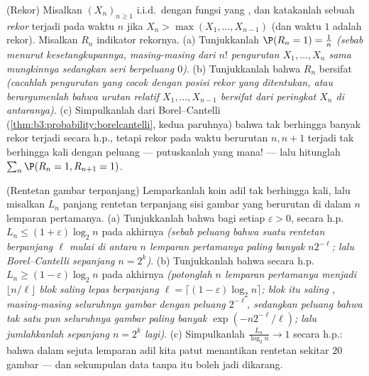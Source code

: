\begin{exercise}[$\star\star$]\label{exo:b3:probability:11}
(Rekor) Misalkan $(X_n)_{n\geq1}$ i.i.d.\ dengan fungsi
 yang , dan katakanlah sebuah \emph{rekor} terjadi pada
waktu $n$ jika $X_n > \max(X_1, \dots, X_{n-1})$ (dan waktu $1$
adalah rekor). Misalkan $R_n$ indikator rekornya.
(a) Tunjukkanlah $\P(R_n = 1) = \frac1n$ \emph{(sebab menurut kesetangkupannya, masing-masing dari
$n!$ pengurutan $X_1, \dots, X_n$ sama mungkinnya
sedangkan seri berpeluang $0$)}.
(b) Tunjukkanlah bahwa $R_n$ bersifat \emph{} \emph{(cacahlah
pengurutan yang cocok dengan posisi rekor yang ditentukan, atau
berargumenlah bahwa urutan relatif $X_1, \dots, X_{n-1}$ bersifat
 dari peringkat $X_n$ di antaranya)}.
(c) Simpulkanlah dari Borel--Cantelli
(\cref{thm:b3:probability:borelcantelli}, kedua paruhnya) bahwa
tak berhingga banyak rekor terjadi secara h.p., tetapi rekor pada
waktu berurutan $n, n+1$ terjadi tak berhingga kali dengan
peluang --- putuskanlah yang mana! --- lalu hitunglah
$\sum_n\P(R_n = 1, R_{n+1} = 1)$.
\end{exercise}

\begin{exercise}[$\star\star$]\label{exo:b3:probability:12}
(Rentetan gambar terpanjang) Lemparkanlah koin adil tak berhingga kali, lalu
misalkan $L_n$ panjang rentetan terpanjang sisi gambar yang
berurutan di dalam $n$ lemparan pertamanya.
(a) Tunjukkanlah bahwa bagi setiap $\varepsilon > 0$, secara h.p.\ $L_n \leq
(1 + \varepsilon)\log_2n$ pada akhirnya \emph{(sebab peluang
bahwa suatu rentetan berpanjang $\ell$ mulai di antara $n$ lemparan
pertamanya paling banyak $n2^{-\ell}$; lalu Borel--Cantelli sepanjang $n =
2^k$)}.
(b) Tunjukkanlah bahwa secara h.p.\ $L_n \geq (1 - \varepsilon)\log_2n$
pada akhirnya \emph{(potonglah $n$ lemparan pertamanya menjadi
$\lfloor n/\ell\rfloor$ blok saling lepas berpanjang $\ell =
\lceil(1 - \varepsilon)\log_2n\rceil$; blok itu saling
, masing-masing seluruhnya gambar dengan peluang $2^{-\ell}$,
sedangkan peluang bahwa tak satu pun seluruhnya gambar paling banyak
$\exp(-n2^{-\ell}/\ell)$; lalu jumlahkanlah sepanjang $n = 2^k$ lagi)}.
(c) Simpulkanlah $\frac{L_n}{\log_2n} \to 1$ secara h.p.: bahwa dalam sejuta
lemparan adil kita patut menantikan rentetan sekitar $20$ gambar ---
dan sekumpulan data tanpa itu boleh jadi dikarang.
\end{exercise}

